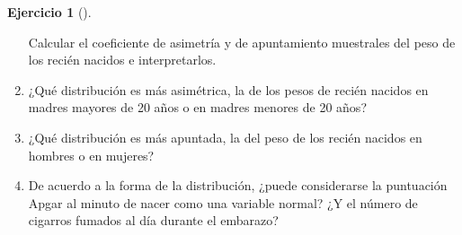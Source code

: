 \documentclass[
  spanish,
  a4paper,
]{scrreport}
\theoremstyle{definition}
\newtheorem{exercise}{Ejercicio}[chapter]
\theoremstyle{remark}
\begin{document}
\begin{exercise}[]
\begin{enumerate}
  Calcular el coeficiente de asimetría y de apuntamiento muestrales del
  peso de los recién nacidos e interpretarlos.
\item
  ¿Qué distribución es más asimétrica, la de los pesos de recién nacidos
  en madres mayores de 20 años o en madres menores de 20 años?
\item
  ¿Qué distribución es más apuntada, la del peso de los recién nacidos
  en hombres o en mujeres?
\item
  De acuerdo a la forma de la distribución, ¿puede considerarse la
  puntuación Apgar al minuto de nacer como una variable normal? ¿Y el
  número de cigarros fumados al día durante el embarazo?
\end{enumerate}

\end{exercise}
\end{document}
